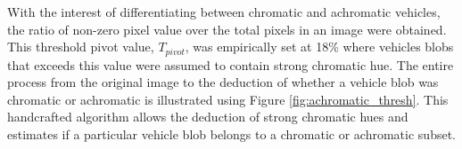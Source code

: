 With the interest of differentiating between chromatic and achromatic vehicles, the ratio of non-zero pixel value over the total pixels in an image were obtained. This threshold pivot value, $T_{pivot}$, was empirically set at 18\% where vehicles blobs that exceeds this value were assumed to contain strong chromatic hue. The entire process from the original image to the deduction of whether a vehicle blob was chromatic or achromatic is illustrated using Figure \ref{fig:achromatic_thresh}. This handcrafted algorithm allows the deduction of strong chromatic hues and estimates if a particular vehicle blob belongs to a chromatic or achromatic subset.


